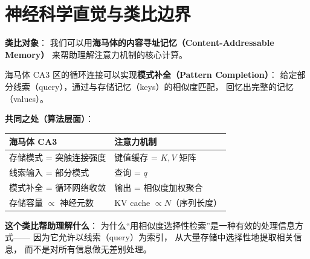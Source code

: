 \section{神经科学直觉与类比边界}
\label{sec:attn_neuro}

\begin{neurosciencebox}[title=神经科学直觉：注意力作为内容寻址记忆]

\textbf{类比对象}：
我们可以用\textbf{海马体的内容寻址记忆（Content-Addressable Memory）}
来帮助理解注意力机制的核心计算。

海马体 CA3 区的循环连接可以实现\textbf{模式补全（Pattern Completion）}：
给定部分线索（query），通过与存储记忆（keys）的相似度匹配，
回忆出完整的记忆（values）。

\textbf{共同之处（算法层面）}：
\begin{center}
\begin{tabular}{p{5cm} p{5cm}}
\toprule
\textbf{海马体 CA3} & \textbf{注意力机制} \\
\midrule
存储模式 = 突触连接强度 & 键值缓存 = $K, V$ 矩阵 \\
线索输入 = 部分模式 & 查询 = $q$ \\
模式补全 = 循环网络收敛 & 输出 = 相似度加权聚合 \\
存储容量 $\propto$ 神经元数 & KV cache $\propto N$（序列长度） \\
\bottomrule
\end{tabular}
\end{center}

\textbf{这个类比帮助理解什么}：
为什么``用相似度选择性检索''是一种有效的处理信息方式——
因为它允许以线索（query）为索引，
从大量存储中选择性地提取相关信息，
而不是对所有信息做无差别处理。

\end{neurosciencebox}

